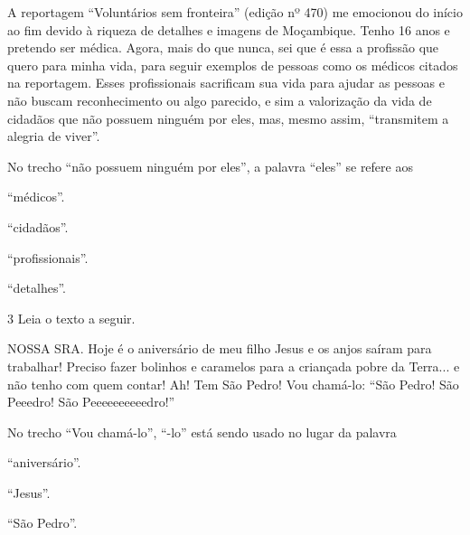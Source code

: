 \begin{conteudo}
\begin{conteudo}
\begin{conteudo}
\begin{conteudo}
\begin{conteudo}
\begin{myquote}
A reportagem ``Voluntários sem fronteira'' (edição nº 470) me emocionou
do início ao fim devido à riqueza de detalhes e imagens de Moçambique.
Tenho 16 anos e pretendo ser médica. Agora, mais do que nunca, sei que é
essa a profissão que quero para minha vida, para seguir exemplos de
pessoas como os médicos citados na reportagem. Esses profissionais
sacrificam sua vida para ajudar as pessoas e não buscam reconhecimento
ou algo parecido, e sim a valorização da vida de cidadãos que não
possuem ninguém por eles, mas, mesmo assim, ``transmitem a alegria de
viver''.

\end{myquote}

No trecho ``não possuem ninguém por eles'', a palavra ``eles'' se refere
aos

\begin{escolha}
\item ``médicos''.

\item ``cidadãos''.

\item ``profissionais''.

\item ``detalhes''.
\end{escolha}

\num{3} Leia o texto a seguir.

\begin{myquote}
NOSSA SRA. Hoje é o aniversário de meu filho Jesus e os anjos saíram
para trabalhar! Preciso fazer bolinhos e caramelos para a criançada pobre da
Terra... e não tenho com quem contar! Ah! Tem São Pedro! Vou chamá-lo: “São
Pedro! São Peeedro! São Peeeeeeeeeedro!” 

\end{myquote}

No trecho ``Vou chamá-lo'', ``-lo'' está sendo usado no lugar da palavra

\begin{escolha}
\item ``aniversário''.

\item ``Jesus''.

\item ``São Pedro''.


\end{escolha}
\end{conteudo}
\end{conteudo}
\end{conteudo}
\end{conteudo}
\end{conteudo}
